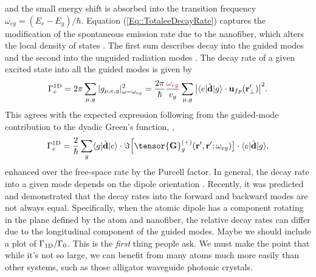 \documentclass[preprint,aps,pra,onecolumn]{revtex4-1} %
\newcommand{\oneD}{{\rm 1D}}
\newcommand{\comment}[1]{{\color{Maroon} #1}}
\begin{document}
and the small energy shift is absorbed into the transition frequency $\omega_{eg} = (E_e - E_g)/\hbar$.  Equation (\ref{Eq::TotaleeDecayRate}) captures the modification of the spontaneous emission rate due to the nanofiber, which alters the local density of states \cite{le_kien_spontaneous_2005}.  The first sum describes decay into the guided modes and the second into the unguided radiation modes \cite{ nha_cavity_1997,klimov_spontaneous_2004,le_kien_spontaneous_2005,maslov_distribution_2006}. The decay rate of a given excited state into all the guided modes is given by
	\begin{equation}
		\Gamma_e^{\oneD}= 2\pi \sum_{\mu,g} |g_{\mu,e,g} |^2_{\omega = \omega_{eg}} =  \frac{ 2\pi }{\hbar} \frac{ \comment{\omega_{eg}} }{v_g} \sum_{\mu,g} \big|\bra{e}\hat{\mathbf{d}}\ket{g} \cdot \mathbf{u}_{fp}(\br'_\perp)\big|^2  .
	\end{equation}
This agrees with the expected expression following from the guided-mode contribution to the dyadic Green's function, ,
	\begin{equation}
		\Gamma_e^{\oneD} =  \frac{2}{\hbar} \sum_{g}  \bra{g}\hat{\mathbf{d}}\ket{e}\cdot 
\Im \Big[\tensor{\mathbf{G}}^{(+)}_g(\br', \br'; \omega_{eg} ) \big] \cdot \bra{e}\hat{\mathbf{d}}\ket{g} ,
	\end{equation}
enhanced over the free-space rate by the Purcell factor.  In general, the decay rate into a given mode depends on the dipole orientation \cite{klimov_spontaneous_2004, vos_orientation-dependent_2009}. Recently, it was predicted \cite{le_kien_anisotropy_2014} and demonstrated \cite{mitsch_quantum_2014} that the decay rates into the forward and backward modes are not always equal.  Specifically, when the atomic dipole has a component rotating in the plane defined by the atom and nanofiber, the relative decay rates can differ due to the longitudinal component of the guided modes. \comment{Maybe we should include a plot of $\Gamma_{\rm 1D}/\Gamma_0$.  This is the \emph{first} thing people ask.  We must make the point that while it's not so large, we can benefit from many atoms much more easily than other systems, such as those alligator waveguide photonic crystals.}
\end{document}
